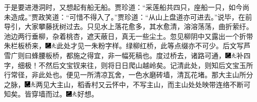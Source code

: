 于是要进港洞时，又想起有船无船。贾珍道：``采莲船共四只，座船一只，如今尚未造成。''贾政笑道：``可惜不得入了。''贾珍道：``从山上盘道亦可进去。''说毕，在前导引，大家攀藤抚树过去。只见水上落花愈多，其水愈清，溶溶荡荡，曲折萦纡。池边两行垂柳，杂着桃杏，遮天蔽日，真无一些尘土。忽见柳阴中又露出一个折带朱栏板桥来，{\includegraphics[width=3mm]{../Images/00003}\includegraphics[width=3mm]{../Images/00012}\footnotesize \kaishu 此处才见一朱粉字样。绿柳红桥，此等点缀亦不可少。后文写芦雪广则曰蜂腰板桥，都施之得宜，非一幅死稿也。}度过桥去，诸路可通，{\includegraphics[width=3mm]{../Images/00003}\includegraphics[width=3mm]{../Images/00012}\footnotesize \kaishu 补四字，细极！不然后文宝钗来往，则将日日爬山越岭矣。记清此处，则知后文宝玉所行常径，非此处也。}便见一所清凉瓦舍，一色水磨砖墙，清瓦花堵。那大主山所分之脉，{\includegraphics[width=3mm]{../Images/00003}\includegraphics[width=3mm]{../Images/00012}\footnotesize \kaishu 两见大主山，稻香村又云怀中，不写主山，而主山处处映带连络不断可知矣。}皆穿墙而过。{\includegraphics[width=3mm]{../Images/00003}\includegraphics[width=3mm]{../Images/00012}\footnotesize \kaishu 好想。}

